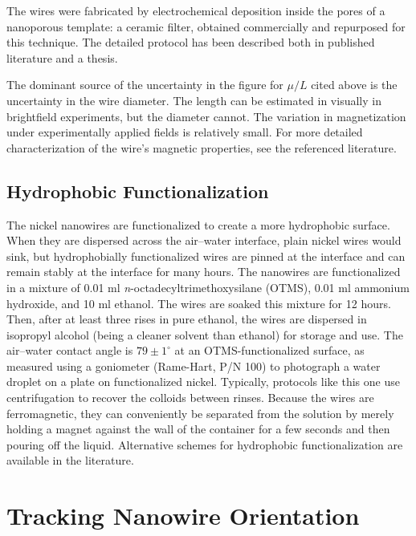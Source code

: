 The wires were fabricated by electrochemical deposition inside the pores of a nanoporous template: a ceramic filter, obtained commercially and repurposed for this technique. The detailed protocol has been described both in published literature\cite{Chien2002} and a thesis\cite{TanaseThesis}.

The dominant source of the uncertainty in the figure for $\mu/L$ cited above is the uncertainty in the wire diameter. The length can be estimated in visually in brightfield experiments, but the diameter cannot. The variation in magnetization under experimentally applied fields is relatively small\cite{Hultgren2004,Hultgren2005}. For more detailed characterization of the wire's magnetic properties, see the referenced literature.

\subsection{Hydrophobic Functionalization}

The nickel nanowires are functionalized to create a more hydrophobic surface. When they are dispersed across the air--water interface, plain nickel wires would sink, but hydrophobially functionalized wires are pinned at the interface and can remain stably at the interface for many hours. The nanowires are functionalized in a mixture of 0.01 ml \emph{n}-octadecyltrimethoxysilane (OTMS), 0.01 ml ammonium hydroxide, and 10 ml ethanol. The wires are soaked this mixture for 12 hours. Then, after at least three rises in pure ethanol, the wires are dispersed in isopropyl alcohol (being a cleaner solvent than ethanol) for storage and use. The air--water contact angle is $79 \pm 1^\circ$ at an OTMS-functionalized surface, as measured using a goniometer (Rame-Hart, P/N 100)\cite{Lee2010} to photograph a water droplet on a plate on functionalized nickel. Typically, protocols like this one use centrifugation to recover the colloids between rinses. Because the wires are ferromagnetic, they can conveniently be separated from the solution by merely holding a magnet against the wall of the container for a few seconds and then pouring off the liquid. Alternative schemes for hydrophobic functionalization are available in the literature\cite{Sugimura2002,Fond2007}.

\section{Tracking Nanowire Orientation}

